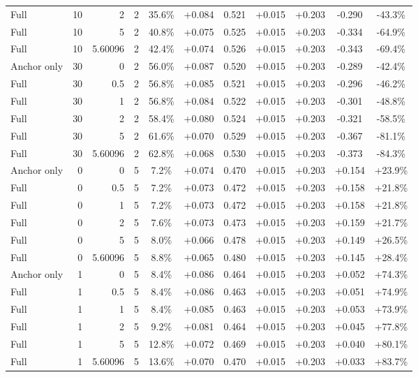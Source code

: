 \begin{table}[htbp]
\begin{tabular}{lrrrccccccc}
Full & 10 & 2 & 2 & 35.6\% & +0.084 & 0.521 & +0.015 & +0.203 & -0.290 & -43.3\% \\
Full & 10 & 5 & 2 & 40.8\% & +0.075 & 0.525 & +0.015 & +0.203 & -0.334 & -64.9\% \\
Full & 10 & 5.60096 & 2 & 42.4\% & +0.074 & 0.526 & +0.015 & +0.203 & -0.343 & -69.4\% \\
Anchor only & 30 & 0 & 2 & 56.0\% & +0.087 & 0.520 & +0.015 & +0.203 & -0.289 & -42.4\% \\
Full & 30 & 0.5 & 2 & 56.8\% & +0.085 & 0.521 & +0.015 & +0.203 & -0.296 & -46.2\% \\
Full & 30 & 1 & 2 & 56.8\% & +0.084 & 0.522 & +0.015 & +0.203 & -0.301 & -48.8\% \\
Full & 30 & 2 & 2 & 58.4\% & +0.080 & 0.524 & +0.015 & +0.203 & -0.321 & -58.5\% \\
Full & 30 & 5 & 2 & 61.6\% & +0.070 & 0.529 & +0.015 & +0.203 & -0.367 & -81.1\% \\
Full & 30 & 5.60096 & 2 & 62.8\% & +0.068 & 0.530 & +0.015 & +0.203 & -0.373 & -84.3\% \\
Anchor only & 0 & 0 & 5 & 7.2\% & +0.074 & 0.470 & +0.015 & +0.203 & +0.154 & +23.9\% \\
Full & 0 & 0.5 & 5 & 7.2\% & +0.073 & 0.472 & +0.015 & +0.203 & +0.158 & +21.8\% \\
Full & 0 & 1 & 5 & 7.2\% & +0.073 & 0.472 & +0.015 & +0.203 & +0.158 & +21.8\% \\
Full & 0 & 2 & 5 & 7.6\% & +0.073 & 0.473 & +0.015 & +0.203 & +0.159 & +21.7\% \\
Full & 0 & 5 & 5 & 8.0\% & +0.066 & 0.478 & +0.015 & +0.203 & +0.149 & +26.5\% \\
Full & 0 & 5.60096 & 5 & 8.8\% & +0.065 & 0.480 & +0.015 & +0.203 & +0.145 & +28.4\% \\
Anchor only & 1 & 0 & 5 & 8.4\% & +0.086 & 0.464 & +0.015 & +0.203 & +0.052 & +74.3\% \\
Full & 1 & 0.5 & 5 & 8.4\% & +0.086 & 0.463 & +0.015 & +0.203 & +0.051 & +74.9\% \\
Full & 1 & 1 & 5 & 8.4\% & +0.085 & 0.463 & +0.015 & +0.203 & +0.053 & +73.9\% \\
Full & 1 & 2 & 5 & 9.2\% & +0.081 & 0.464 & +0.015 & +0.203 & +0.045 & +77.8\% \\
Full & 1 & 5 & 5 & 12.8\% & +0.072 & 0.469 & +0.015 & +0.203 & +0.040 & +80.1\% \\
Full & 1 & 5.60096 & 5 & 13.6\% & +0.070 & 0.470 & +0.015 & +0.203 & +0.033 & +83.7\% \\

\end{tabular}
\end{table}
